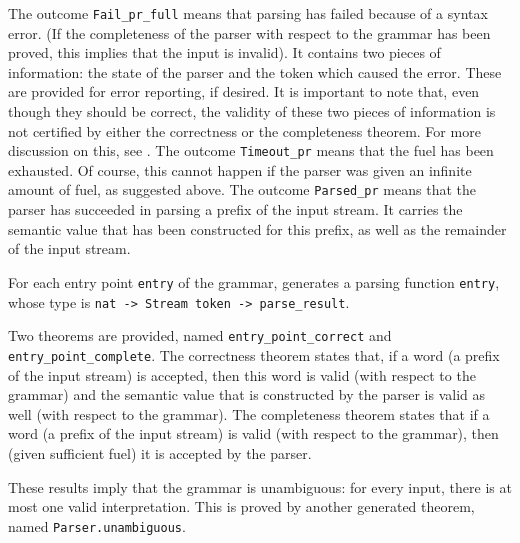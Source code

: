 \documentclass[onecolumn,11pt,nocopyrightspace,preprint]{sigplanconf}
\begin{document}
The outcome \verb+Fail_pr_full+ means that parsing has failed because of a syntax
error. (If the completeness of the parser with respect to the grammar has been
proved, this implies that the input is invalid). It contains two pieces of information:
the state of the parser and the token which caused the error. These are provided for
error reporting, if desired. It is important to note that, even though they should be correct,
the validity of these two pieces of information is not certified by either the correctness
or the completeness theorem. For more discussion on this, see .
The outcome \verb+Timeout_pr+ means that the fuel has been exhausted.
Of course, this cannot happen if the parser was given an infinite amount of fuel,
as suggested above. The outcome \verb+Parsed_pr+ means that the parser has
succeeded in parsing a prefix of the input stream. It carries the semantic value
that has been constructed for this prefix, as well as the remainder of the input stream.

For each entry point \verb+entry+ of the grammar, \menhir generates a
parsing function \verb+entry+, whose type is
\verb+nat -> Stream token -> parse_result+.


Two theorems are provided, named \verb+entry_point_correct+ and
\verb+entry_point_complete+. The correctness theorem states that, if a word (a
prefix of the input stream) is accepted, then this word is valid (with respect
to the grammar) and the semantic value that is constructed by the parser is
valid as well (with respect to the grammar). The completeness theorem states
that if a word (a prefix of the input stream) is valid (with respect to the
grammar), then (given sufficient fuel) it is accepted by the parser.

These results imply that the grammar is unambiguous: for every input, there is
at most one valid interpretation. This is proved by another generated theorem,
named \verb+Parser.unambiguous+.


\end{document}
